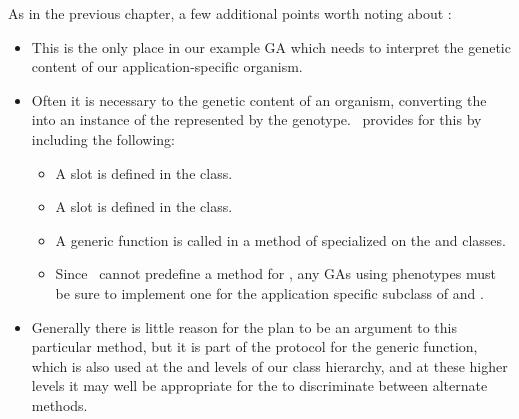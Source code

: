 {\samepage
As in the previous chapter, a few additional points worth noting about :
\begin{itemize}
  \item This is the only place in our example GA which needs 
	to interpret the genetic content of our application-specific organism.
  \item Often it is necessary to  the genetic content of an 
	organism, converting the  into an instance of the
	 represented by the genotype.  \Geco\ provides for this by 
	including the following:
    \begin{itemize}
	\item A  slot is defined in the  class.
	\item A  slot is defined in the
		 class.
	\item A  generic function is called in a  method 
		of  specialized on the
       	 and  
		 classes.
	\item Since \geco\ cannot predefine a method for , any GAs
		using phenotypes must be sure to implement one for the application
		specific subclass of  and
		.
    \end{itemize}
  \item Generally there is little reason for the plan to be an argument to
	this particular method, but it is part of the protocol for the
	 generic function, which is also used at the 
	 and  levels of our class hierarchy, and
        at these higher levels it may well be appropriate for the
         to discriminate between alternate methods.  
\end{itemize}
}%

\filbreak


